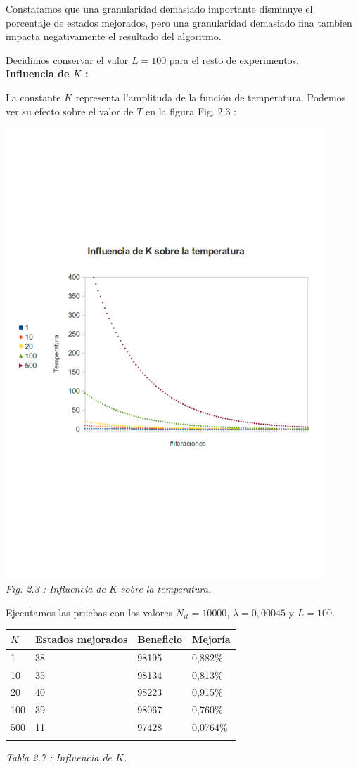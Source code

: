 \documentclass{article}
\begin{document}
Constatamos que una granularidad demasiado importante disminuye el porcentaje de
estados mejorados, pero una granularidad demasiado fina tambien impacta
negativamente el resultado del algoritmo.

Decidimos conservar el valor $L=100$ para el resto de experimentos.\\

\textbf{Influencia de $K$ : }

La constante $K$ representa l'amplituda de la función de temperatura.
Podemos ver su efecto sobre el valor de $T$ en la figura Fig. 2.3 :
\begin{center}
\includegraphics[width=12cm]{K}\\
{\it Fig. 2.3 : Influencia de $K$ sobre la temperatura.}
\end{center}

Ejecutamos las pruebas con los valores $N_{it} = 10 000$, $\lambda = 0,00045$ y
$L=100$.

\begin{center}
\begin{tabular}{|l||l|l|l|}
\hline
$K$ & Estados mejorados & Beneficio & Mejoría\\
\hline
1 & 38 & 98195 & 0,882\%\\
\hline
10 & 35 & 98134 & 0,813\%\\
\hline
20 & 40 & 98223 & 0,915\%\\
\hline
100 & 39 & 98067 & 0,760\%\\
\hline
500 & 11 & 97428 & 0,0764\%\\
\hline\\
\end{tabular}
{\it Tabla 2.7 : Influencia de $K$.}
\end{center}
\end{document}

